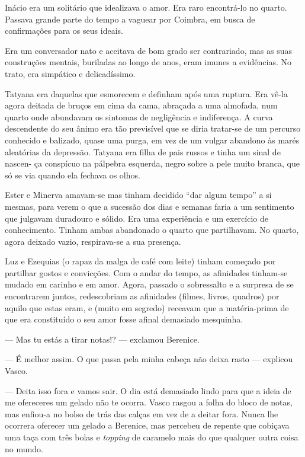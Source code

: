 Inácio era um solitário que idealizava o amor. Era raro encontrá-lo no
quarto. Passava grande parte do tempo a vaguear por Coimbra, em busca de
confirmações para os seus ideais.


Era um conversador nato e aceitava de bom grado ser contrariado, mas
as suas construções mentais, buriladas ao longo de anos, eram imunes a
evidências. No trato, era simpático e delicadíssimo.

Tatyana era daquelas que esmorecem e definham após uma ruptura. Era
vê-la agora deitada de bruços em cima da cama, abraçada a uma almofada,
num quarto onde abundavam os sintomas de negligência e indiferença. A
curva descendente do seu ânimo era tão previsível que se diria
tratar-se de um percurso conhecido e balizado, quase uma purga, em vez
de um vulgar abandono às marés aleatórias da depressão. Tatyana era
filha de pais russos e tinha um sinal de nascen- ça conspícuo na
pálpebra esquerda, negro sobre a pele muito branca, que só se via quando
ela fechava os olhos.

Ester e Minerva amavam-se mas tinham decidido ``dar algum tempo'' a si
mesmas, para verem o que a sucessão dos dias e semanas faria a um
sentimento que julgavam duradouro e sólido. Era uma experiência e um
exercício de conhecimento. Tinham ambas abandonado o quarto que
partilhavam. No quarto, agora deixado vazio, respirava-se a sua
presença.

Luz e Ezequias (o rapaz da malga de café com leite) tinham começado
por partilhar gostos e convicções. Com o andar do tempo, as afinidades
tinham-se mudado em carinho e em amor. Agora, passado o sobressalto e a
surpresa de se encontrarem juntos, redescobriam as afinidades (filmes,
livros, quadros) por aquilo que estas eram, e (muito em segredo) receavam que a matéria-prima de que era constituído o seu amor fosse
afinal demasiado mesquinha.

--- Mas tu estás a tirar notas!? --- exclamou Berenice.

--- É melhor assim. O que passa pela minha cabeça não deixa rasto ---
  explicou Vasco.

--- Deita isso fora e vamos sair. O dia está demasiado lindo para que a
  ideia de me ofereceres um gelado não te ocorra. Vasco rasgou a folha
  do bloco de notas, mas enfiou-a no bolso de trás das calças em vez de
  a deitar fora. Nunca lhe ocorrera oferecer um gelado a Berenice, mas
  percebeu de repente que cobiçava uma taça com três bolas e
  \emph{topping }de caramelo mais do que qualquer outra coisa no mundo.

